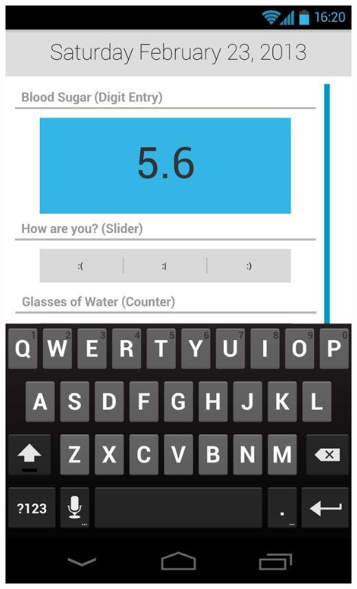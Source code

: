 \documentclass[pdftex,12pt,a4paper]{report}
\begin{document}
\includegraphics[scale=0.18]{Screens/03-Add--Add-Entry.png}
\\\\
\end{document}
